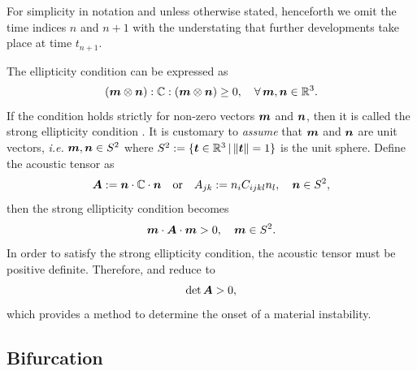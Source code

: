 \documentclass[12pt]{article}
\numberwithin{equation}{section}
\begin{document}
For simplicity in notation and unless otherwise stated, henceforth we
omit the time indices $n$ and $n+1$ with the understating that further
developments take place at time $t_{n+1}$.

The ellipticity condition can be expressed as
\begin{equation} \label{eq:strong-ellipticity}
  ({\boldsymbol{m}} \otimes {\boldsymbol{n}}) : \mathbb{C} : ({\boldsymbol{m}} \otimes {\boldsymbol{n}}) \ge 0,
  \quad
  \forall \, {\boldsymbol{m}}, {\boldsymbol{n}} \in \mathbb{R}^3.
\end{equation}
If the condition holds strictly for non-zero vectors ${\boldsymbol{m}}$ and ${\boldsymbol{n}}$,
then it is called the strong ellipticity condition
\citep{Hadamard:1903, Truesdell.Noll:2004,
  Miehe.Lambrecht.Gurses:2004}. It is customary to \emph{assume} that
${\boldsymbol{m}}$ and ${\boldsymbol{n}}$ are unit vectors, \emph{i.e.} ${\boldsymbol{m}}, {\boldsymbol{n}} \in S^2$ where
$S^2 := \{ {\boldsymbol{t}} \in \mathbb{R}^3 \, | \, \| {\boldsymbol{t}} \| = 1\}$ is the unit
sphere. Define the acoustic tensor as
\begin{equation} \label{eq:acoustic-tensor}
  {\boldsymbol{A}} := {\boldsymbol{n}} \cdot \mathbb{C} \cdot {\boldsymbol{n}}
  \quad \text{or} \quad
  A_{jk} := n_i C_{ijkl} n_l,
  \quad
  {\boldsymbol{n}} \in S^2,
\end{equation}
then the strong ellipticity condition becomes
\begin{equation} \label{eq:acoustic-ellipticity}
  {\boldsymbol{m}} \cdot {\boldsymbol{A}} \cdot {\boldsymbol{m}} > 0, \quad {\boldsymbol{m}} \in S^2.
\end{equation}
In order to satisfy the strong ellipticity condition, the acoustic
tensor must be positive definite. Therefore,
 and 
reduce to
\begin{equation} \label{eq:acoustic-determinant}
  \det {\boldsymbol{A}} > 0,
\end{equation}
which provides a method to determine the onset of a material
instability.

\subsection{Bifurcation}
\end{document}
